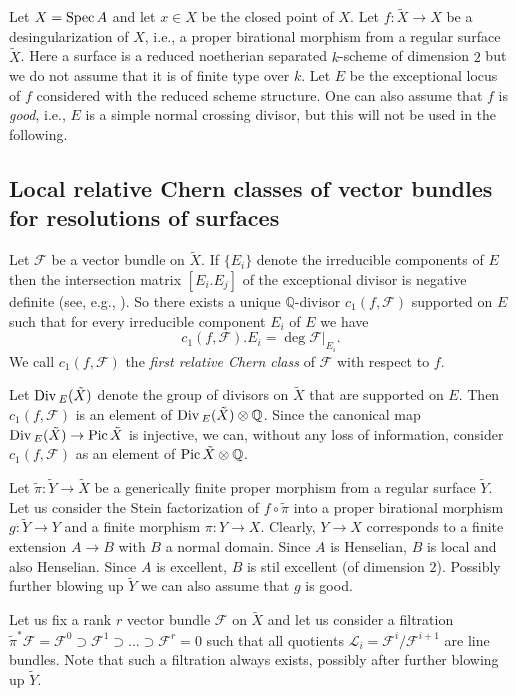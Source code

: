 \documentclass[twoside, 11pt]{article}
\theoremstyle{plain}
\theoremstyle{definition}
\theoremstyle{remark}
\newcommand{\QQ}{{\mathbb Q}}
\newcommand{\cF}{{\mathcal F}}
\newcommand{\cL}{{\mathcal L}}
\newcommand{\Pic}{{\mathop{\rm Pic \, }}}
\newcommand{\Spec}{{\mathop{{\rm Spec\, }}}}
\newcommand{\Div}{\mathop{\rm Div\, }}
\begin{document}
 
 
Let $X=\Spec A$ and let $x\in X$ be the closed point of $X$. 
Let  $f:\tilde X\to X$ be a desingularization of $X$, i.e., a proper birational morphism from a regular surface $\tilde X$. Here a surface is a reduced noetherian separated $k$-scheme of dimension $2$ but we do not assume that it is of finite type over $k$. Let $E$ be the exceptional locus of $f$ considered with the reduced scheme structure. 
One can also assume that $f$ is \emph{good}, i.e., $E$ is a simple normal crossing divisor, but this will not be used in the following. 

\subsection{Local relative Chern classes of vector bundles for resolutions of surfaces}\label{local-relative-RR} 

Let $\cF$ be a vector bundle on $\tilde X$. If $\{E_i\}$ denote the irreducible components of $E$ then 
 the intersection matrix $[E_i.E_j]$ of the exceptional divisor is negative definite (see, e.g., \cite[Lemma 14.1]{Li}).
So  there exists a unique $\QQ$-divisor $c_1(f, \cF )$ supported on $E$ such that for every irreducible component $E_{i}$ of $E$ we have 
$$c_1(f ,\cF ) . E_{i} =\deg \cF |_{E_{i}}.$$
We call $c_1(f, \cF )$ the \emph{first relative Chern class} of $\cF$ with respect to $f$.

Let $\Div _E(\tilde X)$ denote the group of divisors on $\tilde X$ that are supported on $E$.
Then $c_1(f, \cF )$ is an element of $\Div _E(\tilde X)\otimes \QQ$. Since the canonical 
map $\Div _E(\tilde X)\to \Pic \tilde X$ is injective, we can, without any loss of information, consider  $c_1(f, \cF )$ as an element of  $ \Pic \tilde X\otimes \QQ$.


\medskip

Let $\tilde \pi: \tilde Y\to \tilde X$ be a generically finite proper morphism from a regular surface $\tilde Y$.
Let us consider the Stein factorization of $f\circ \tilde \pi$  into a proper birational morphism $g:\tilde Y\to Y$ and a finite morphism $\pi:Y\to X$. Clearly, $Y\to X$ corresponds to a finite extension $A\to B$ with $B$ a normal domain. Since $A$ is Henselian, $B$ is local and also Henselian. Since $A$ is excellent, $B$ is stil excellent (of dimension $2$).
Possibly further blowing up $\tilde Y$ we can also assume that $g$ is good.


Let us fix a rank $r$  vector bundle  $\cF$ on $\tilde X$ and let us consider a filtration $\tilde \pi ^*\cF=\cF ^0\supset \cF^1 \supset ...\supset \cF ^r=0$ such that all quotients $\cL _i= \cF^i/{\cF^{i+1}}$ are line bundles. Note that such a filtration always exists, possibly after further blowing up $\tilde Y$.
\end{document}
